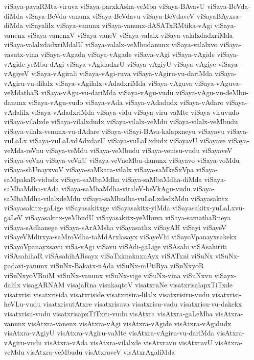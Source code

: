 {viSaya-payaRMta-viruva
viSaya-parxkAsha-veMba
viSaya-BAvavU
viSaya-BeVda-diMda
viSaya-BeVda-vanunx
viSaya-BeVdavu
viSaya-BeVdaveV
viSayaBAyxsa-diMda
viSayalilx
viSaya-vanunx
viSaya-vanunx-dASATxRMtika-vAgi
viSaya-vanenx
viSaya-vanenxV
viSaya-vaneV
viSaya-valalx
viSaya-valalxdadxriMda
viSaya-valalxdadxriMdalU
viSaya-valalx-veMbudanunx
viSaya-valalxvo
viSaya-vasutx-vina
viSaya-vAgada
viSaya-vAgade
viSaya-vAgi
viSaya-vAgide
viSaya-vAgide-yeMbu-dAgi
viSaya-vAgidadxrU
viSaya-vAgiyU
viSaya-vAgiye
viSaya-vAgiyeV
viSaya-vAgirali
viSaya-vAgi-ruva
viSaya-vAgiru-vu-dariMda
viSaya-vAgiru-vu-dilalx
viSaya-vAgilalx-vAdadxriMda
viSaya-vAguva
viSaya-vAguva-veMdathaR
viSaya-vAgu-vu-dariMda
viSaya-vAgu-vudu
viSaya-vAgu-vu-deMbu-danunx
viSaya-vAgu-vudo
viSaya-vAda
viSaya-vAdadudx
viSaya-vAdaro
viSaya-vAdalilx
viSaya-vAdadxriMda
viSaya-vidu
viSaya-viru-vaMte
viSaya-viruvudo
viSaya-vilalxde
viSaya-vilalxdudx
viSaya-vilalx-veMdu
viSaya-vilalx-veMbudu
viSaya-vilalx-venunx-vu-dAdare
viSaya-viSayi-BAva-kalapxneyu
viSayavu
viSaya-vuLaLx
viSaya-vuLaLxdAdxdarU
viSaya-vuLaLxdudx
viSayavU
viSayave
viSaya-veMda-reVnu
viSaya-veMdu
viSaya-veMbudu
viSaya-venisu-vudu
viSayaveV
viSaya-veVnu
viSaya-veVnU
viSaya-veVneMbu-danunx
viSayavo
viSaya-voMdu
viSaya-shUnayxvoV
viSaya-saMkara-vilalx
viSaya-saMkeSxVpa
viSaya-saMpakaR-vidudx
viSaya-saMbaMdha
viSaya-saMbaMdha-diMda
viSaya-saMbaMdha-vAda
viSaya-saMbaMdha-viraleV-beVkAgu-vudu
viSaya-saMbaMdha-vilalxdeMdu
viSaya-saMbadha-vuLaLxdedxMdu
viSayasakitx
viSayasakitx-gaLige
viSayasakitxge
viSayasakitx-yiMda
viSayasakitx-yuLaLxvu-gaLeV
viSayasakitx-yeMbudU
viSayasakitx-yeMbuva
viSaya-samathaRneya
viSaya-sAdhanege
viSaya-sArAMsha
viSayasathx
viSayAH
viSayi
viSayeV
viSayeVMdirxya-saMroVdha-taMdArxlasayx
viSayeVhi
viSayoVpanayxsakekx
viSayoVpanayxsavu
viSa-vAgi
viSavu
viSAdi-gaLige
viSAsahi
viSAsahiriti
viSAsahihaR
viSAsahihARsayx
viSaTxknaknxnAyx
viSATxni
viSuNx
viSuNx-padavi-yanunx
viSuNx-Bakatx-nAda
viSuNx-mUtiRya
viSuNxyoR
viSuNxyoVRniM
viSuNx-vanunx
viSuNx-vige
viSuNx-vina
viSuNxvu
viSayx-dalilx
visagARNAM
visajaRna
visukaqtoV
visatxraNe
visatxrisalapxTiTxde
visatxrisi
visatxrisida
visatxriside
visatxrisira-lilalx
visatxrisiru-vudu
visatxrisi-heVLu-vudu
visatxrisutAtxre
visatxrisuva
visatxrisu-vadu
visatxrisu-vu-dakekx
visatxrisu-vudu
visatxrisapxTiTxru-vudu
visAtxra
visAtxra-gaLeMba
visAtxra-vanunx
visAtxra-vanenx
visAtxra-vAgi
visAtxra-vAgide
visAtxra-vAgidudx
visAtxra-vAgiyU
visAtxra-vAgiru-vaMte
visAtxra-vAgiru-vu-dariMda
visAtxra-vAgiru-vudu
visAtxra-vAda
visAtxra-vilalxde
visAtxravu
visAtxravU
visAtxra-veMdu
visAtxra-veMbudu
visAtxraveV
visAtxrAgaliMda
}
